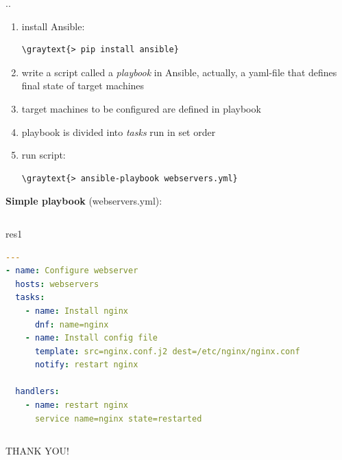 \documentclass[pdf, 8pt, unicode, t]{beamer} %
\newcommand{\bluetext}[1]{{\usebeamercolor[fg]{bluetext_color}#1}}
\newcommand{\graytext}[1]{{\usebeamercolor[fg]{graytext_color}#1}}
\newcommand{\myinsertsubsection}{\alert{\Large\insertsectionnumber.\insertsubsectionnumber. \insertsubsection}\\}
\begin{document}
\begin{frame}[fragile, label=none]
%
\myinsertsubsection

\begin{enumerate}
\item install Ansible:
\begin{Verbatim}[commandchars=\\\{\}]
\graytext{> pip install ansible}
\end{Verbatim}
\item write a script called a {\it playbook} in Ansible, actually, a yaml-file
that defines final state of target machines
\item target machines to be configured are defined in playbook
\item playbook is divided into {\it tasks} run in set order
\item run script:
\begin{Verbatim}[commandchars=\\\{\}]
\graytext{> ansible-playbook webservers.yml}
\end{Verbatim}
\end{enumerate}
%
\vspace{2mm}
{\bf Simple playbook} (webservers.yml):
\vspace{1mm}
%
\begin{columns}[t]
\begin{beamercolorbox}[sep=-1.0em,rounded=true,shadow=true,center]{res1}
\begin{lstlisting}[language=yaml]
---
- name: Configure webserver
  hosts: webservers
  tasks:
    - name: Install nginx
      dnf: name=nginx
    - name: Install config file
      template: src=nginx.conf.j2 dest=/etc/nginx/nginx.conf
      notify: restart nginx

  handlers:
    - name: restart nginx
      service name=nginx state=restarted
\end{lstlisting}
\end{beamercolorbox}
\end{columns}
\end{frame}


\begin{frame}[plain,c,label=thanks]
\begin{center}
\textrm{\bluetext{\Large THANK YOU!}}
\end{center}
\end{frame}
\end{document}
